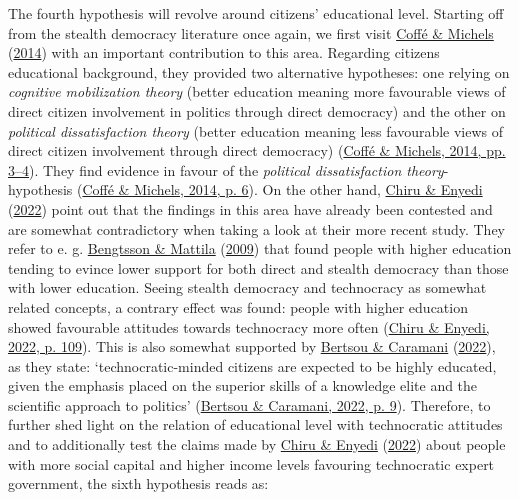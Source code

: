 \documentclass[
  12pt,
  english,
]{article}
\begin{document}
The fourth hypothesis will revolve around citizens' educational level.
Starting off from the stealth democracy literature once again, we first
visit \protect\hyperlink{ref-coffe2014education}{Coffé \& Michels}
(\protect\hyperlink{ref-coffe2014education}{2014}) with an important
contribution to this area. Regarding citizens educational background,
they provided two alternative hypotheses: one relying on \emph{cognitive
mobilization theory} (better education meaning more favourable views of
direct citizen involvement in politics through direct democracy) and the
other on \emph{political dissatisfaction theory} (better education
meaning less favourable views of direct citizen involvement through
direct democracy) (\protect\hyperlink{ref-coffe2014education}{Coffé \&
Michels, 2014, pp. 3--4}). They find evidence in favour of the
\emph{political dissatisfaction theory}-hypothesis
(\protect\hyperlink{ref-coffe2014education}{Coffé \& Michels, 2014, p.
6}). On the other hand, \protect\hyperlink{ref-chiru2022wants}{Chiru \&
Enyedi} (\protect\hyperlink{ref-chiru2022wants}{2022}) point out that
the findings in this area have already been contested and are somewhat
contradictory when taking a look at their more recent study. They refer
to e. g. \protect\hyperlink{ref-bengtsson2009direct}{Bengtsson \&
Mattila} (\protect\hyperlink{ref-bengtsson2009direct}{2009}) that found
people with higher education tending to evince lower support for both
direct and stealth democracy than those with lower education. Seeing
stealth democracy and technocracy as somewhat related concepts, a
contrary effect was found: people with higher education showed
favourable attitudes towards technocracy more often
(\protect\hyperlink{ref-chiru2022wants}{Chiru \& Enyedi, 2022, p. 109}).
This is also somewhat supported by
\protect\hyperlink{ref-bertsou2022people}{Bertsou \& Caramani}
(\protect\hyperlink{ref-bertsou2022people}{2022}), as they state:
`technocratic-minded citizens are expected to be highly educated, given
the emphasis placed on the superior skills of a knowledge elite and the
scientific approach to politics'
(\protect\hyperlink{ref-bertsou2022people}{Bertsou \& Caramani, 2022, p.
9}). Therefore, to further shed light on the relation of educational
level with technocratic attitudes and to additionally test the claims
made by \protect\hyperlink{ref-chiru2022wants}{Chiru \& Enyedi}
(\protect\hyperlink{ref-chiru2022wants}{2022}) about people with more
social capital and higher income levels favouring technocratic expert
government, the sixth hypothesis reads as:
\end{document}
